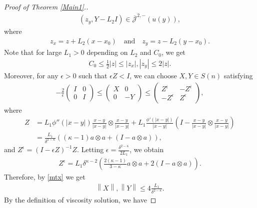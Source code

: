 \documentclass[reqno]{amsart}
\theoremstyle{plain}
\theoremstyle{definition}
\theoremstyle{remark}
\newcommand{\norm}[1]{\left\lVert#1\right\rVert}
\numberwithin{equation}{section}
\begin{document}
\begin{proof}[Proof of Theorem \ref{Main1}.]
\begin{align*}
         (z_y, Y-L_2I)\in \overline{\mathcal{J}}^{2,-} \left( u(y)\right),
     \end{align*}
     where
     \begin{align*}
         z_x = z+L_2(x-x_0) \quad \text{and} \quad z_y = z-L_2(y-x_0).
     \end{align*}
     Note that for large $L_1>0$ depending on $L_2$ and $C_0$, we get
     \begin{align} \label{zxest}
          C_0\leq \frac{1}{2}|z| \leq |z_x|,|z_y| \leq 2|z|.
     \end{align}
     Moreover, for any $\epsilon>0$ such that $\epsilon Z<I$, we can choose $X,Y \in S(n)$ satisfying
     \begin{align} \label{mtx}
     -\frac{2}{\epsilon} 
        \begin{pmatrix}
            I & 0 \\
            0 &I
        \end{pmatrix}
        \leq
        \begin{pmatrix}
             X & 0 \\
             0 &-Y
         \end{pmatrix}
         \leq
         \begin{pmatrix}
             Z^\epsilon & -Z^\epsilon \\
             -Z^\epsilon & Z^\epsilon
         \end{pmatrix},
     \end{align}
     where
     \begin{align*}
         Z &= L_1 \phi''(|x-y|)\frac{x-y}{|x-y|}\otimes\frac{x-y}{|x-y|} + L_1 \frac{\phi'(|x-y|)}{|x-y|} \left(I-\frac{x-y}{|x-y|}\otimes\frac{x-y}{|x-y|}\right) \\
         &=\frac{L_1}{\delta^{2-\kappa}}\left( (\kappa-1)a\otimes a + (I-a\otimes a) \right),
     \end{align*}
     and $Z^\epsilon = (I-\epsilon Z)^{-1} Z$.
     Letting $\epsilon = \frac{\delta^{2-\kappa}}{2L_1}$, we obtain
     \begin{align*}
         Z^\epsilon = L_1\delta^{\kappa-2} \left( \frac{2(\kappa-1)}{3-\kappa}a \otimes a + 2(I-a\otimes a)\right).
     \end{align*}
     Therefore, by \eqref{mtx} we get
     \begin{align} \label{Xest}
         \norm{X}, \norm{Y} \leq 4\frac{L_1}{\delta^{2-\kappa}}.
     \end{align}
     By the definition of viscosity solution, we have

\end{proof}
\end{document}
